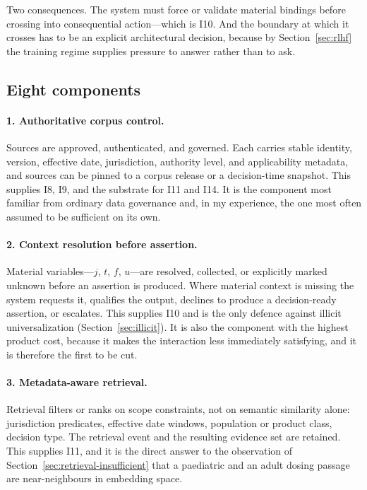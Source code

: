Two consequences. The system must force or validate material bindings before
crossing into consequential action---which is I10. And the boundary at which it
crosses has to be an explicit architectural decision, because by
Section~\ref{sec:rlhf} the training regime supplies pressure to answer rather than
to ask.

\subsection{Eight components}

\paragraph{1. Authoritative corpus control.} Sources are approved, authenticated,
and governed. Each carries stable identity, version, effective date, jurisdiction,
authority level, and applicability metadata, and sources can be pinned to a corpus
release or a decision-time snapshot. This supplies I8, I9, and the substrate for
I11 and I14. It is the component most familiar from ordinary data governance and,
in my experience, the one most often assumed to be sufficient on its own.

\paragraph{2. Context resolution before assertion.} Material variables---$j$, $t$,
$f$, $u$---are resolved, collected, or explicitly marked unknown before an
assertion is produced. Where material context is missing the system requests it,
qualifies the output, declines to produce a decision-ready assertion, or escalates.
This supplies I10 and is the only defence against illicit universalization
(Section~\ref{sec:illicit}). It is also the component with the highest product cost,
because it makes the interaction less immediately satisfying, and it is therefore
the first to be cut.

\paragraph{3. Metadata-aware retrieval.} Retrieval filters or ranks on scope
constraints, not on semantic similarity alone: jurisdiction predicates, effective
date windows, population or product class, decision type. The retrieval event and
the resulting evidence set are retained. This supplies I11, and it is the direct
answer to the observation of Section~\ref{sec:retrieval-insufficient} that a
paediatric and an adult dosing passage are near-neighbours in embedding space.

